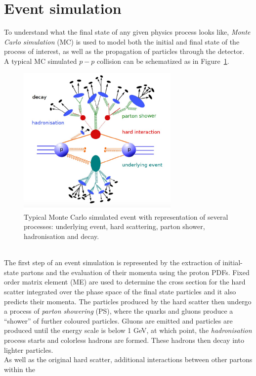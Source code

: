 \section{Event simulation}
To understand what the final state of any given physics process looks like,
\textit{Monte Carlo simulation} (MC) is used to model both the initial and final state of the 
process of interest, as well as the propagation of particles through the detector. \\
A typical MC simulated $p-p$ collision can be schematized as in Figure~\ref{fig:MC}.
\begin{figure}[h]
	\centering
	\includegraphics[width=0.7\textwidth]{Chapters/CH4/figures/MC}
	\caption{Typical Monte Carlo simulated event with representation of several processes: underlying event, hard scattering, parton shower, hadronisation and decay.}
	\label{fig:MC}
\end{figure}
\\ The first step of an event simulation is represented by the extraction of initial-state partons and the evaluation of their momenta using the proton PDFs.
Fixed order matrix element (ME) are used to determine the cross section for the hard scatter 
integrated over the phase space of the final state particles and it also predicts their momenta.
The particles produced by the hard scatter then undergo a process of \textit{parton showering} 
(PS), where the quarks and gluons produce a “shower” of further coloured particles.
Gluons are emitted and particles are produced until the energy scale is below 1 GeV, at which point, the 
\textit{hadronisation} process starts and colorless hadrons are formed. These hadrons then decay 
into lighter particles.\\
As well as the original hard scatter, additional interactions between other partons within the
